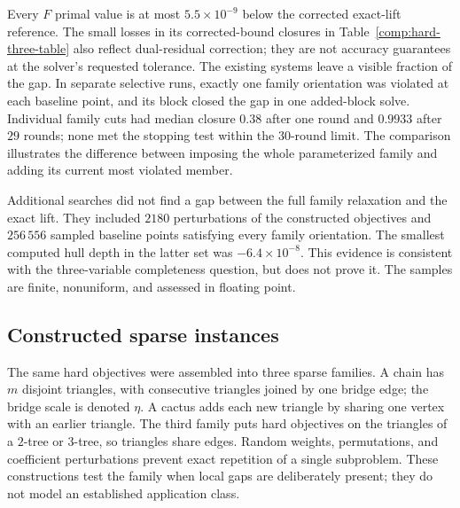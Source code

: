 Every $F$ primal value is at most $5.5\times10^{-9}$ below the
corrected exact-lift reference. The small losses in its corrected-bound
closures in Table~\ref{comp:hard-three-table} also reflect dual-residual
correction; they are not accuracy guarantees at the solver's requested
tolerance. The existing systems leave a visible fraction of the gap.
In separate selective
runs, exactly one family orientation was violated at each baseline
point, and its block closed the gap in one added-block solve. Individual
family cuts had median closure $0.38$ after one round and $0.9933$
after $29$ rounds; none met the stopping test within the $30$-round
limit. The comparison illustrates the difference between imposing the
whole parameterized family and adding its current most violated member.

Additional searches did not find a gap between the full family relaxation
and the exact lift. They included $2180$ perturbations of the constructed
objectives and $256\,556$ sampled baseline points satisfying every
family orientation. The smallest computed hull depth in the latter set
was $-6.4\times10^{-8}$. This evidence is consistent with the
three-variable completeness question, but does not prove it. The samples
are finite, nonuniform, and assessed in floating point.

\subsection{Constructed sparse instances}
\label{comp:constructed}

The same hard objectives were assembled into three sparse families.
A chain has $m$ disjoint triangles, with consecutive triangles joined by
one bridge edge; the bridge scale is denoted $\eta$.
A cactus adds each new triangle by sharing one vertex with an earlier
triangle. The third family puts hard objectives on the triangles of
a $2$-tree or $3$-tree, so triangles share edges. Random weights,
permutations, and coefficient perturbations prevent exact repetition
of a single subproblem. These constructions test the family when local
gaps are deliberately present; they do not model an established
application class.

